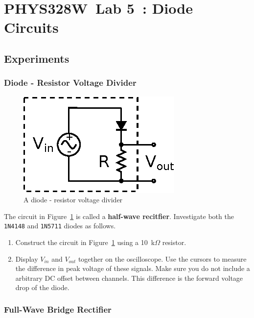 \documentclass[11pt]{article}
\newcommand{\COURSE}{PHYS328W}
\newcommand{\LABNUM}{5}
\newcommand{\TITLE}{Diode Circuits}
\begin{document}
\thispagestyle{empty}

\section*{\COURSE\ Lab \LABNUM\ : \TITLE}

\subsection*{Experiments}

\subsubsection*{Diode - Resistor Voltage Divider}

\begin{figure}[h]
\centering
\includegraphics{diodevdivider.eps}
\caption{A diode - resistor voltage divider}
\label{fig:diodevdivider}
\end{figure}
The circuit in Figure~\ref{fig:diodevdivider} is called a
\textbf{half-wave recitfier}.  Investigate both the \texttt{1N4148}
and \texttt{1N5711} diodes as follows.

\begin{enumerate}
\item Construct the circuit in Figure~\ref{fig:diodevdivider} using a
  10~k$\Omega$ resistor.
  
\item Display $V_{in}$ and $V_{out}$ together on the oscilloscope. Use
  the cursors to measure the difference in peak voltage of these
  signals. Make sure you do not include a arbitrary DC offset between
  channels. This difference is the forward voltage drop of the diode.
\end{enumerate}

\subsubsection*{Full-Wave Bridge Rectifier}
\end{document}
